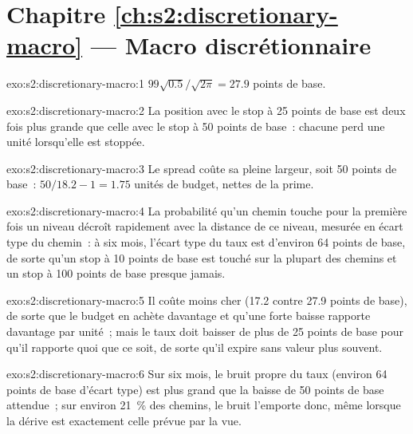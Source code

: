 \section*{Chapitre \ref{ch:s2:discretionary-macro} --- Macro discrétionnaire}

\begin{solution}{exo:s2:discretionary-macro:1}
$99\sqrt{0.5}/\sqrt{2\pi} = 27.9$ points de base.
\end{solution}

\begin{solution}{exo:s2:discretionary-macro:2}
La position avec le stop à 25 points de base est deux fois plus grande que celle avec le stop à 50 points de base~: chacune perd une unité lorsqu'elle est stoppée.
\end{solution}

\begin{solution}{exo:s2:discretionary-macro:3}
Le spread coûte sa pleine largeur, soit 50 points de base~: $50/18.2 - 1 = 1.75$ unités de budget, nettes de la prime.
\end{solution}

\begin{solution}{exo:s2:discretionary-macro:4}
La probabilité qu'un chemin touche pour la première fois un niveau décroît rapidement avec la distance de ce niveau, mesurée en écart type du chemin~: à six mois, l'écart type
du taux est d'environ 64 points de base, de sorte qu'un stop à 10 points de base est touché sur la plupart des chemins et un stop à 100 points de base presque jamais.
\end{solution}

\begin{solution}{exo:s2:discretionary-macro:5}
Il coûte moins cher (17.2 contre 27.9 points de base), de sorte que le budget en achète davantage et qu'une forte baisse rapporte davantage par unité~; mais le taux doit baisser
de plus de 25 points de base pour qu'il rapporte quoi que ce soit, de sorte qu'il expire sans valeur plus souvent.
\end{solution}

\begin{solution}{exo:s2:discretionary-macro:6}
Sur six mois, le bruit propre du taux (environ 64 points de base d'écart type) est plus grand que la baisse de 50 points de base attendue~; sur environ 21~\%
des chemins, le bruit l'emporte donc, même lorsque la dérive est exactement celle prévue par la vue.
\end{solution}

